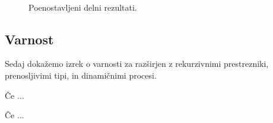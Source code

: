 \begin{figure}[h]
	\centering
	\small
	\begin{mathpar}
	\\
	\quad
	\end{mathpar}

	\caption{Poenostavljeni delni rezultati.}
	\label{fig:rezultati-poenostavitev}
\end{figure}



\subsection{Varnost}

Sedaj dokažemo izrek o varnosti za \lae{} razširjen z rekurzivnimi prestrezniki, prenosljivimi tipi, in dinamičnimi procesi.

\begin{izrek}
	Če ...
\end{izrek}



\begin{izrek}
	Če ...
\end{izrek}



